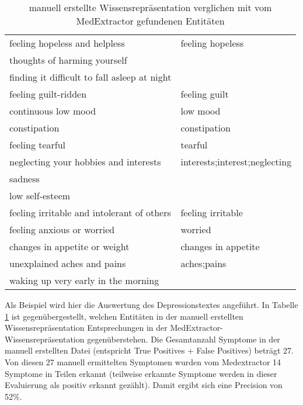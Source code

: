 \begin{table}
\begin{center}
\begin{tabular}{ll}
                     feeling hopeless and helpless &              feeling hopeless \\
                      thoughts of harming yourself &                               \\
      finding it difficult to fall asleep at night &                               \\
                              feeling guilt-ridden &                 feeling guilt \\
                               continuous low mood &                      low mood \\
                                      constipation &                  constipation \\
                                   feeling tearful &                       tearful \\
             neglecting your hobbies and interests & interests;interest;neglecting \\
                                           sadness &                               \\
                                   low self-esteem &                               \\
        feeling irritable and intolerant of others &             feeling irritable \\
                        feeling anxious or worried &                       worried \\
                     changes in appetite or weight &           changes in appetite \\
                       unexplained aches and pains &                   aches;pains \\
               waking up very early in the morning &                               \\
\bottomrule
\end{tabular}
\caption{manuell erstellte Wissensrepräsentation verglichen mit vom MedExtractor gefundenen Entitäten}
\label{tab:vergleich_manuell_medextractor}
\end{center}
\end{table}

Als Beispiel wird hier die Auswertung des Depressionstextes angeführt. In Tabelle \ref{tab:vergleich_manuell_medextractor} ist gegenübergestellt, welchen Entitäten in der manuell erstellten Wissensrepräsentation Entsprechungen in der MedExtractor-Wissens\-reprä\-sentation gegenüberstehen. Die Gesamtanzahl Symptome in der manuell erstellten Datei (entspricht True Positives + False Positives) beträgt 27. Von diesen 27 manuell ermittelten Symptomen wurden vom Medextractor 14 Symptome in Teilen erkannt (teilweise erkannte Symptome werden in dieser Evaluierung als positiv erkannt gezählt). Damit ergibt sich eine Precision von 52\%.



